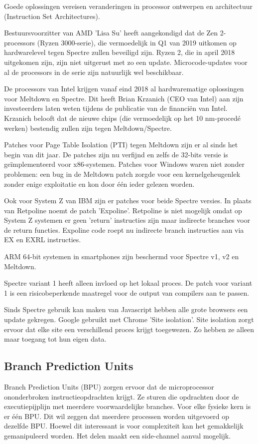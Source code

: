 Goede oplossingen vereisen veranderingen in processor ontwerpen en architectuur (Instruction Set Architectures).

Bestuursvoorzitter van AMD 'Lisa Su' heeft aangekondigd dat de Zen 2-processors (Ryzen 3000-serie), die vermoedelijk in Q1 van 2019 uitkomen op hardwarelevel tegen Spectre zullen beveiligd zijn. Ryzen 2, die in april 2018 uitgekomen zijn, zijn niet uitgerust met zo een update. Microcode-updates voor al de processors in de serie zijn natuurlijk wel beschikbaar.

De processors van Intel krijgen vanaf eind 2018 al hardwarematige oplossingen voor Meltdown en Spectre.
Dit heeft Brian Krzanich (CEO van Intel) aan zijn investeerders laten weten tijdens de publicatie van de financiën van Intel. Krzanich belooft dat de nieuwe chips (die vermoedelijk op het 10 nm-procedé werken) bestendig zullen zijn tegen Meltdown/Spectre.

Patches voor Page Table Isolation (PTI) tegen Meltdown zijn er al sinds het begin van dit jaar. De patches zijn nu verfijnd en zelfs de 32-bits versie is geïmplementeerd voor x86-systemen.
Patches voor Windows waren niet zonder problemen: een bug in de Meltdown patch zorgde voor een kernelgeheugenlek zonder enige exploitatie en kon door één ieder gelezen worden.

Ook voor System Z van IBM zijn er patches voor beide Spectre versies.
In plaats van Retpoline noemt de patch 'Expoline'.
Retpoline is niet mogelijk omdat op System Z systemen er geen 'return' instructies zijn maar indirecte branches voor de return functies. Expoline code roept nu indirecte branch instructies aan via EX en EXRL instructies.

ARM 64-bit systemen in smartphones zijn beschermd voor Spectre v1, v2 en Meltdown.

Spectre variant 1 heeft alleen invloed op het lokaal proces.
De patch voor variant 1 is een risicobeperkende maatregel voor de output van compilers aan te passen.

Sinds Spectre gebruik kan maken van Javascript hebben alle grote browsers een update gekregen.
Google gebruikt met Chrome 'Site isolation'. Site isolation zorgt ervoor dat elke site een verschillend proces krijgt toegewezen. Zo hebben ze alleen maar toegang tot hun eigen data.

\subsection{Branch Prediction Units}
Branch Prediction Units (BPU) zorgen ervoor dat de microprocessor ononderbroken instructieopdrachten krijgt.
Ze sturen die opdrachten door de executiepijplijn met meerdere voorwaardelijke branches.
Voor elke fysieke kern is er één BPU.
Dit wil zeggen dat meerdere processen worden uitgevoerd op dezelfde BPU.
Hoewel dit interessant is voor complexiteit kan het gemakkelijk gemanipuleerd worden.
Het delen maakt een side-channel aanval mogelijk.

